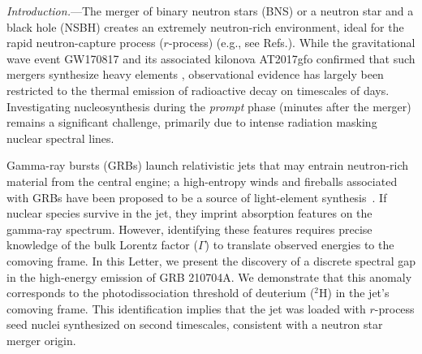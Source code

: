 \documentclass[prd,twocolumn,amsmath,amssymb,aps]{revtex4-2} %
\begin{document}
\maketitle

\textit{Introduction.}---The merger of binary neutron stars (BNS) or a neutron star and a black hole (NSBH) creates an extremely neutron-rich environment, ideal for the rapid neutron-capture process ($r$-process) (e.g., see Refs.\cite{1974ApJ...192L.145L, 1989Natur.340..126E,2018ApJ...869..130R,2019LRR....23....1M,2020ApJ...903L...3W,2024Natur.626..737L}). While the gravitational wave event GW170817 and its associated kilonova AT2017gfo confirmed that such mergers synthesize heavy elements \cite{2017PhRvL.119p1101A, 2017Natur.551...80K, 2019LRR....23....1M}, observational evidence has largely been restricted to the thermal emission of radioactive decay on timescales of days. Investigating nucleosynthesis during the \textit{prompt} phase (minutes after the merger) remains a significant challenge, primarily due to intense radiation masking nuclear spectral lines.


Gamma-ray bursts (GRBs) launch relativistic jets that may entrain neutron-rich material from the central engine; a high-entropy winds and fireballs associated with GRBs have been proposed to be a source of light-element synthesis~\citep[][]{1967ARA&A...5..525F,2001ApJ...561..957P,2000ApJ...533..424O,2001ApJ...562..887T,2002ApJ...580..368P}. If nuclear species survive in the jet, they imprint absorption features on the gamma-ray spectrum. However, identifying these features requires precise knowledge of the bulk Lorentz factor ($\Gamma$) to translate observed energies to the comoving frame. In this Letter, we present the discovery of a discrete spectral gap in the high-energy emission of GRB 210704A. We demonstrate that this anomaly corresponds to the photodissociation threshold of deuterium ($^2$H) in the jet's comoving frame. This identification implies that the jet was loaded with $r$-process seed nuclei synthesized on second timescales, consistent with a neutron star merger origin.
\end{document}
